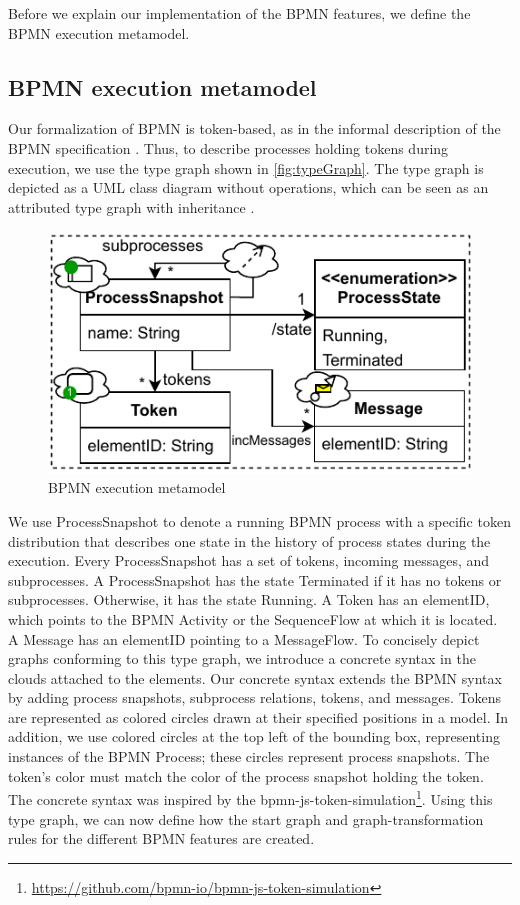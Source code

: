 \documentclass[runningheads]{llncs}
\begin{document}
Before we explain our implementation of the BPMN features, we define the BPMN execution metamodel.

\subsection{BPMN execution metamodel}

Our formalization of BPMN is token-based, as in the informal description of the BPMN specification \cite{objectmanagementgroupBusinessProcessModel2013}.
Thus, to describe processes holding tokens during execution, we use the type graph shown in \autoref{fig:typeGraph}.
The type graph is depicted as a UML class diagram without operations, which can be seen as an attributed type graph with inheritance \cite{heckelGraphTransformationSoftware2020}.

\begin{figure}[ht]
  \centering
  \includegraphics[width=0.5\linewidth]{images/bpmn_semantics-typegraph.pdf}
  \caption{BPMN execution metamodel}
  \label{fig:typeGraph}
\end{figure}

We use \textsf{ProcessSnapshot} to denote a running BPMN process with a specific token distribution that describes one state in the history of process states during the execution.
Every \textsf{ProcessSnapshot} has a set of \textsf{tokens}, incoming \textsf{messages}, and \textsf{subprocesses}.
A \textsf{ProcessSnapshot} has the state \textsf{Terminated} if it has no \textsf{tokens} or \textsf{subprocesses}.
Otherwise, it has the state \textsf{Running}.
A \textsf{Token} has an \textsf{elementID}, which points to the BPMN \textsf{Activity} or the \textsf{SequenceFlow} at which it is located.
A \textsf{Message} has an \textsf{elementID} pointing to a \textsf{MessageFlow}.
To concisely depict graphs conforming to this type graph, we introduce a concrete syntax in the clouds attached to the elements.
Our concrete syntax extends the BPMN syntax by adding process snapshots, subprocess relations, tokens, and messages.
Tokens are represented as colored circles drawn at their specified positions in a model.
In addition, we use colored circles at the top left of the bounding box, representing instances of the BPMN \textsf{Process}; these circles represent process snapshots.
The token's color must match the color of the process snapshot holding the token.
The concrete syntax was inspired by the bpmn-js-token-simulation\footnote{\url{https://github.com/bpmn-io/bpmn-js-token-simulation}}.
Using this type graph, we can now define how the start graph and graph-transformation rules for the different BPMN features are created.
\end{document}
